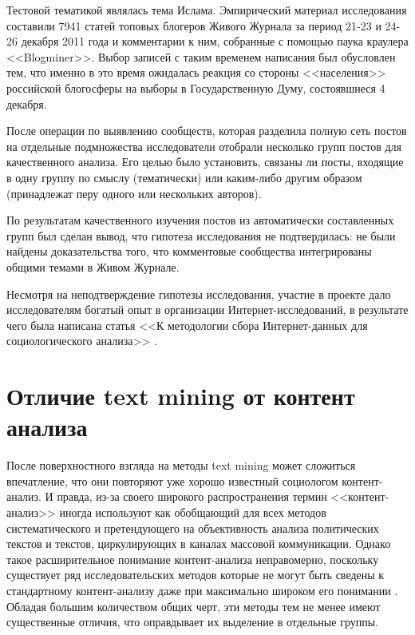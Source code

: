 Тестовой тематикой являлась тема Ислама. Эмпирический материал исследования составили 7941 статей топовых блогеров Живого Журнала за период 21-23 и 24-26 декабря 2011 года и комментарии к ним, собранные с помощью паука краулера <<Blogminer>>. Выбор записей с таким временем написания был обусловлен тем, что именно в это время ожидалась реакция со стороны <<населения>> российской блогосферы на выборы в Государственную Думу, состоявшиеся 4 декабря.


После операции по выявлению сообществ, которая разделила полную сеть постов на отдельные подмножества исследователи отобрали несколько групп постов для качественного анализа. Его целью было установить, связаны ли посты, входящие в одну группу по смыслу (тематически) или каким-либо другим образом (принадлежат перу одного или нескольких авторов).

По результатам качественного изучения постов из автоматически составленных групп был сделан вывод, что гипотеза исследования не подтвердилась: не были найдены доказательства того, что комментовые сообщества интегрированы общими темами в Живом Журнале.

Несмотря на неподтверждение гипотезы исследования, участие в проекте дало исследователям богатый опыт в организации Интернет-исследований, в результате чего была написана статья <<К методологии сбора Интернет-данных для социологического анализа>> \cite{methodlogy_internet}.

\section{Отличие text mining от контент анализа}

После поверхностного взгляда на методы text mining может сложиться впечатление, что они повторяют уже хорошо известный социологом контент-анализ. И правда, из-за своего широкого распространения термин <<контент-анализ>> иногда используют как обобщающий для всех методов систематического и претендующего на объективность анализа политических текстов и текстов, циркулирующих в каналах массовой коммуникации. Однако такое расширительное понимание контент-анализа неправомерно, поскольку существует ряд исследовательских методов  которые не могут быть сведены к стандартному контент-анализу даже при максимально широком его понимании \cite{Iudin2010}. Обладая большим количеством общих черт, эти методы тем не менее имеют существенные отличия, что оправдывает их выделение в отдельные группы.

